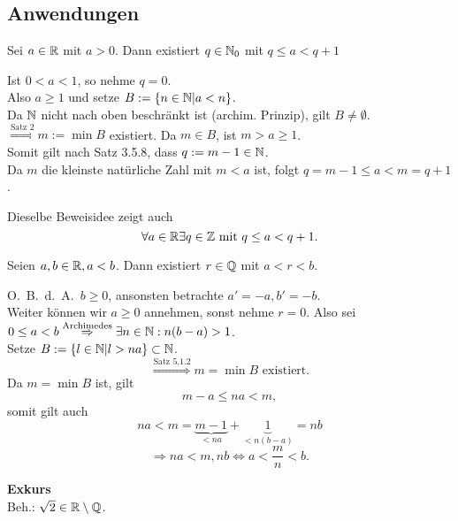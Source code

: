 \documentclass[../ana1.tex]{subfiles}
\begin{document}
\subsection{Anwendungen}
\begin{lem}
	Sei \( a\in\mathbb{R} \) mit \( a > 0 \). Dann existiert \(q\in\mathbb{N}_0\) mit \(q\leq a<q+1\)
\end{lem}
\begin{bew}
	Ist \( 0 < a < 1 \), so nehme \( q = 0 \).\\
	Also \(a\geq 1\) und setze \(B := \{ n\in\mathbb{N} | a < n \} \).\\
	Da \( \mathbb{N} \) nicht nach oben beschränkt ist (archim. Prinzip), gilt \(B\neq \emptyset \).\\
	\(\overset{\text{Satz 2}}{\Rightarrow} m:=\min B\) existiert. Da \(m\in B\), ist \(m> a \geq 1\).\\
	Somit gilt nach Satz 3.5.8, dass \(q:= m-1\in\mathbb{N} \).\\
	Da \( m \) die kleinste natürliche Zahl mit \(m<a\) ist, folgt \(q = m-1 \leq a < m = q+1\).
\end{bew}
\begin{bem}
	Dieselbe Beweisidee zeigt auch 
	\[ \forall a\in\mathbb{R}\exists q\in\mathbb{Z} \text{ mit } q\leq a<q+1.\]
\end{bem}
\begin{satz}
	Seien \( a,b\in\mathbb{R}, a<b \). Dann existiert \( r\in\mathbb{Q} \) mit \(a<r<b\).
\end{satz}
\begin{bew}
	O.\ B.\ d.\ A.\  \(b\geq 0\), ansonsten betrachte \( a' = -a, b' = -b \).\\
	Weiter können wir \(a\geq 0\) annehmen, sonst nehme \(r=0\).
	Also sei \(0\leq a <b \overset{\text{Archimedes}}{\Rightarrow} \exists n\in\mathbb{N}: n(b-a)>1\).\\
	Setze \( B := \{ l\in\mathbb{N} | l > na \} \subset \mathbb{N} \).
	\[ \overset{\text{Satz 5.1.2}}{\Rightarrow} m = \min B \text{ existiert}.\]
	Da \(m=\min B\) ist, gilt 
	\[m -a\leq na<m,\] 
	somit gilt auch 
	\[ na<m=\underbrace{m-1}_{<na}+\underbrace{1}_{<n(b-a)}=nb \]
	\[ \Rightarrow na<m,nb \Leftrightarrow a<\frac{m}{n}<b.\]
\end{bew}
\textbf{Exkurs}\\
Beh.: \( \sqrt{2}\in\mathbb{R}\setminus \mathbb{Q} \).
\end{document}
